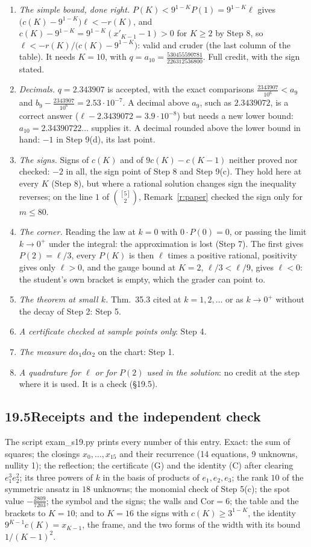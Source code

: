 \documentclass[11pt]{article}
\theoremstyle{plain}
\theoremstyle{definition}
\theoremstyle{remark}
\begin{document}
\begin{enumerate}[label=\arabic*.]
\item \emph{The simple bound, done right.} $P(K)<9^{1-K}P(1)=9^{1-K}\ell$ gives $\big(c(K)-9^{1-K}\big)\ell<-r(K)$, and $c(K)-9^{1-K}=9^{1-K}(x'_{K-1}-1)>0$ for $K\ge2$ by Step 8, so $\ell<-r(K)/\big(c(K)-9^{1-K}\big)$: valid and cruder (the last column of the table). It needs $K=10$, with $q=a_{10}=\frac{530455590781}{226312536800}$. Full credit, with the sign stated.
\item \emph{Decimals.} $q=2.343907$ is accepted, with the exact comparisons $\frac{2343907}{10^6}<a_9$ and $b_9-\frac{2343907}{10^6}=2.53\cdot10^{-7}$. A decimal above $a_9$, such as $2.3439072$, is a correct answer ($\ell-2.3439072=3.9\cdot10^{-8}$) but needs a new lower bound: $a_{10}=2.34390722\ldots$ supplies it. A decimal rounded above the lower bound in hand: $-1$ in Step 9(d), its last point.
\item \emph{The signs.} Signs of $c(K)$ and of $9c(K)-c(K-1)$ neither proved nor checked: $-2$ in all, the sign point of Step 8 and Step 9(c). They hold here at every $K$ (Step 8), but where a rational solution changes sign the inequality reverses; on the line $1$ of $\binom{[5]}2$, Remark~\ref{r:paper} checked the sign only for $m\le80$.
\item \emph{The corner.} Reading the law at $k=0$ with $0\cdot P(0)=0$, or passing the limit $k\to0^+$ under the integral: the approximation is lost (Step 7). The first gives $P(2)=\ell/3$, every $P(K)$ is then $\ell$ times a positive rational, positivity gives only $\ell>0$, and the gauge bound at $K=2$, $\ell/3<\ell/9$, gives $\ell<0$: the student's own bracket is empty, which the grader can point to.
\item \emph{The theorem at small $k$.} Thm.~35.3 cited at $k=1,2,\dots$ or as $k\to0^+$ without the decay of Step 2: Step 5.
\item \emph{A certificate checked at sample points only}: Step 4.
\item \emph{The measure} $d\alpha_1d\alpha_2$ on the chart: Step 1.
\item \emph{A quadrature for $\ell$ or for $P(2)$ used in the solution}: no credit at the step where it is used. It is a check (\S19.5).
\end{enumerate}

\subsection*{19.5\quad Receipts and the independent check}

The script exam\_s19.py prints every number of this entry. Exact: the sum of squares; the closings $x_0,\dots,x_{15}$ and their recurrence (14 equations, 9 unknowns, nullity 1); the reflection; the certificate (G) and the identity (C) after clearing $e_1^3e_2^2$; its three powers of $k$ in the basis of products of $e_1,e_2,e_3$; the rank $10$ of the symmetric ansatz in $18$ unknowns; the monomial check of Step 5(c); the spot value $-\frac{2809}{7203}$; the symbol and the signs; the walls and $\mathrm{Cor}=6$; the table and the brackets to $K=10$; and to $K=16$ the signs with $c(K)\ge3^{1-K}$, the identity $9^{K-1}c(K)=x_{K-1}$, the frame, and the two forms of the width with its bound $1/(K-1)^2$.
\end{document}
